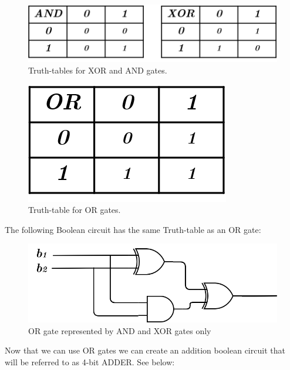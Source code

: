 \documentclass{article}
\begin{document}
\begin{figure}[H]
    \centering
    \includegraphics[width=1\linewidth]{Picture2.png}
    \caption{Truth-tables for XOR and AND gates.}
    \label{fig:enter-label}
\end{figure}

\begin{figure}[H]
    \centering
    \includegraphics[width=0.4\linewidth]{Picture3.png}
    \caption{Truth-table for OR gates.}
    \label{fig:enter-label}
\end{figure}

The following Boolean circuit has the same Truth-table as an OR gate:
\begin{figure}[H]
    \centering
    \includegraphics[width=1\linewidth]{OR GATE.png}
    \caption{OR gate represented by AND and XOR gates only}
    \label{fig:enter-label}
\end{figure}
Now that we can use OR gates we can create an addition boolean circuit that will be referred to as 4-bit ADDER. See below:
\end{document}

